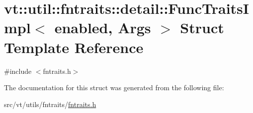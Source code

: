 \hypertarget{structvt_1_1util_1_1fntraits_1_1detail_1_1_func_traits_impl}{}\section{vt\+:\+:util\+:\+:fntraits\+:\+:detail\+:\+:Func\+Traits\+Impl$<$ enabled, Args $>$ Struct Template Reference}
\label{structvt_1_1util_1_1fntraits_1_1detail_1_1_func_traits_impl}


{\ttfamily \#include $<$fntraits.\+h$>$}



The documentation for this struct was generated from the following file\+:\begin{DoxyCompactItemize}
\item 
src/vt/utils/fntraits/\hyperlink{fntraits_8h}{fntraits.\+h}\end{DoxyCompactItemize}
